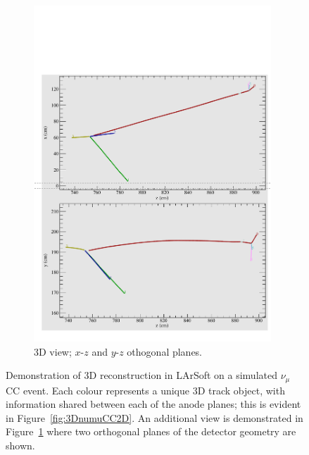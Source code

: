 \begin{figure}
\begin{subfigure}[t]{0.48\linewidth}
    \centering
    \includegraphics[width=0.98\textwidth]{3DnumuCC3D.pdf}
    \caption{3D view; $x$-$z$ and $y$-$z$ othogonal planes.}
    \label{fig:3DnumuCC3D}
  \end{subfigure}
  \caption[Demonstration of 3D reconstruction in LArSoft on a simulated $\nu_{\mu}$CC event.]{Demonstration of 3D reconstruction in LArSoft on a simulated $\nu_{\mu}$CC event.  Each colour represents a unique 3D track object, with information shared between each of the anode planes; this is evident in Figure~\ref{fig:3DnumuCC2D}.  An additional view is demonstrated in Figure~\ref{fig:3DnumuCC3D} where two orthogonal planes of the detector geometry are shown.}
  \label{fig:3DnumuCC}
\end{figure}

